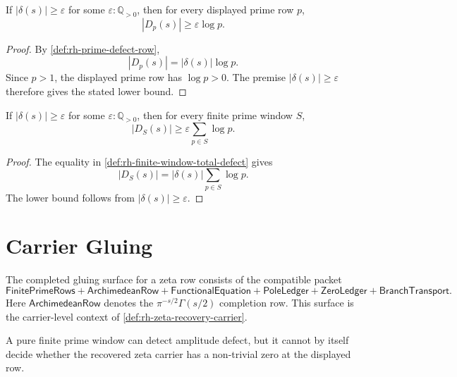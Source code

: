 \begin{theorem}
\label{thm:rh-apart-nonfixed-creates-local-defects}
If $|\delta(s)|\ge\varepsilon$ for some $\varepsilon:\mathbb Q_{>0}$, then
for every displayed prime row $p$,
$$
|D_{p}(s)|\ge\varepsilon\log p.
$$
\end{theorem}

\begin{proof}
By \autoref{def:rh-prime-defect-row},
$$
|D_{p}(s)|
=
|\delta(s)|\log p.
$$
Since $p>1$, the displayed prime row has $\log p>0$. The premise
$|\delta(s)|\ge\varepsilon$ therefore gives the stated lower bound.
\end{proof}

\begin{theorem}
\label{thm:rh-finite-window-defect-accumulation}
If $|\delta(s)|\ge\varepsilon$ for some $\varepsilon:\mathbb Q_{>0}$, then
for every finite prime window $S$,
$$
|D_{S}(s)|
\ge
\varepsilon\sum_{p\in S}\log p.
$$
\end{theorem}

\begin{proof}
The equality in \autoref{def:rh-finite-window-total-defect} gives
$$
|D_{S}(s)|
=
|\delta(s)|\sum_{p\in S}\log p.
$$
The lower bound follows from $|\delta(s)|\ge\varepsilon$.
\end{proof}

\section{Carrier Gluing}
\label{sec:rh-finite-window-carrier-gluing}

\begin{definition}
\label{def:rh-completed-gluing-surface}
The completed gluing surface for a zeta row consists of the compatible
packet
$$
\mathsf{FinitePrimeRows}
+
\mathsf{ArchimedeanRow}
+
\mathsf{FunctionalEquation}
+
\mathsf{PoleLedger}
+
\mathsf{ZeroLedger}
+
\mathsf{BranchTransport}.
$$
Here $\mathsf{ArchimedeanRow}$ denotes the
$\pi^{-s/2}\Gamma(s/2)$ completion row. This surface is the carrier-level
context of \autoref{def:rh-zeta-recovery-carrier}.
\end{definition}

\begin{theorem}
\label{thm:rh-pure-finite-windows-not-zero-carriers}
A pure finite prime window can detect amplitude defect, but it cannot by
itself decide whether the recovered zeta carrier has a non-trivial zero at
the displayed row.
\end{theorem}

